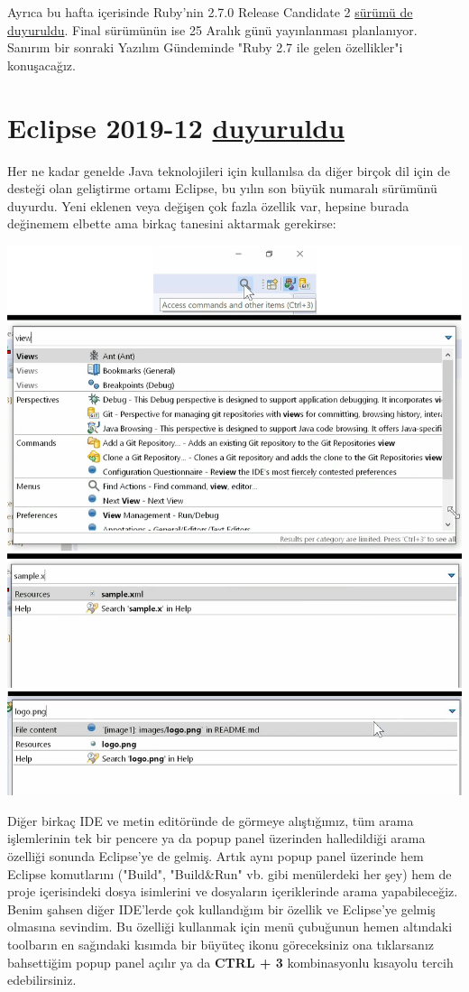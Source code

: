 \documentclass[11pt]{article}
\begin{document}
Ayrıca bu hafta içerisinde Ruby'nin 2.7.0 Release Candidate 2 \href{https://www.ruby-lang.org/en/news/2019/12/21/2-7-0-rc2-released/}{sürümü de
duyuruldu}. Final sürümünün ise 25 Aralık günü yayınlanması planlanıyor.
Sanırım bir sonraki Yazılım Gündeminde "Ruby 2.7 ile gelen özellikler"i
konuşacağız.
\section{Eclipse 2019-12 \href{https://www.eclipse.org/eclipseide/2019-12/noteworthy/}{duyuruldu}}
\label{sec:org50e3367}
Her ne kadar genelde Java teknolojileri için kullanılsa da diğer birçok dil
için de desteği olan geliştirme ortamı Eclipse, bu yılın son büyük numaralı
sürümünü duyurdu. Yeni eklenen veya değişen çok fazla özellik var, hepsine
burada değinemem elbette ama birkaç tanesini aktarmak gerekirse:

\begin{center}
\includegraphics[width=.9\linewidth]{gorseller/eclipse1912-actions.png}
\end{center}

Diğer birkaç IDE ve metin editöründe de görmeye alıştığımız, tüm arama
işlemlerinin tek bir pencere ya da popup panel üzerinden halledildiği arama
özelliği sonunda Eclipse'ye de gelmiş. Artık aynı popup panel üzerinde hem
Eclipse komutlarını ("Build", "Build\&Run" vb. gibi menülerdeki her şey) hem de
proje içerisindeki dosya isimlerini ve dosyaların içeriklerinde arama
yapabileceğiz. Benim şahsen diğer IDE'lerde çok kullandığım bir özellik ve
Eclipse'ye gelmiş olmasına sevindim. Bu özelliği kullanmak için menü çubuğunun
hemen altındaki toolbarın en sağındaki kısımda bir büyüteç ikonu göreceksiniz
ona tıklarsanız bahsettiğim popup panel açılır ya da \textbf{CTRL + 3} kombinasyonlu
kısayolu tercih edebilirsiniz.
\end{document}
